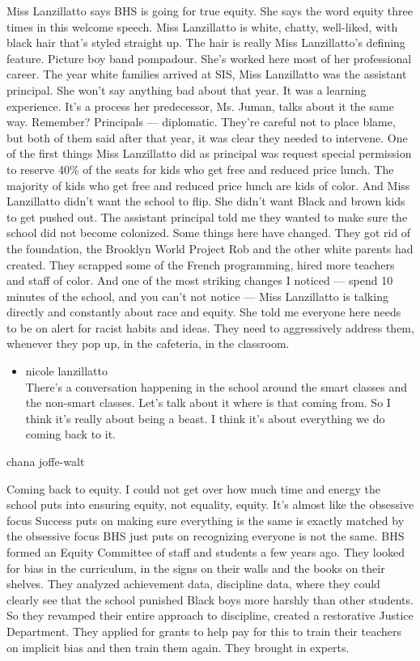 Miss Lanzillatto says BHS is going for true equity. She says the word
equity three times in this welcome speech. Miss Lanzillatto is white,
chatty, well-liked, with black hair that's styled straight up. The hair
is really Miss Lanzillatto's defining feature. Picture boy band
pompadour. She's worked here most of her professional career. The year
white families arrived at SIS, Miss Lanzillatto was the assistant
principal. She won't say anything bad about that year. It was a learning
experience. It's a process her predecessor, Ms. Juman, talks about it
the same way. Remember? Principals --- diplomatic. They're careful not
to place blame, but both of them said after that year, it was clear they
needed to intervene. One of the first things Miss Lanzillatto did as
principal was request special permission to reserve 40\% of the seats
for kids who get free and reduced price lunch. The majority of kids who
get free and reduced price lunch are kids of color. And Miss Lanzillatto
didn't want the school to flip. She didn't want Black and brown kids to
get pushed out. The assistant principal told me they wanted to make sure
the school did not become colonized. Some things here have changed. They
got rid of the foundation, the Brooklyn World Project Rob and the other
white parents had created. They scrapped some of the French programming,
hired more teachers and staff of color. And one of the most striking
changes I noticed --- spend 10 minutes of the school, and you can't not
notice --- Miss Lanzillatto is talking directly and constantly about
race and equity. She told me everyone here needs to be on alert for
racist habits and ideas. They need to aggressively address them,
whenever they pop up, in the cafeteria, in the classroom.

\begin{itemize}
\tightlist
\item
  nicole lanzillatto\\
  There's a conversation happening in the school around the smart
  classes and the non-smart classes. Let's talk about it where is that
  coming from. So I think it's really about being a beast. I think it's
  about everything we do coming back to it.
\end{itemize}

chana joffe-walt

Coming back to equity. I could not get over how much time and energy the
school puts into ensuring equity, not equality, equity. It's almost like
the obsessive focus Success puts on making sure everything is the same
is exactly matched by the obsessive focus BHS just puts on recognizing
everyone is not the same. BHS formed an Equity Committee of staff and
students a few years ago. They looked for bias in the curriculum, in the
signs on their walls and the books on their shelves. They analyzed
achievement data, discipline data, where they could clearly see that the
school punished Black boys more harshly than other students. So they
revamped their entire approach to discipline, created a restorative
Justice Department. They applied for grants to help pay for this to
train their teachers on implicit bias and then train them again. They
brought in experts.

